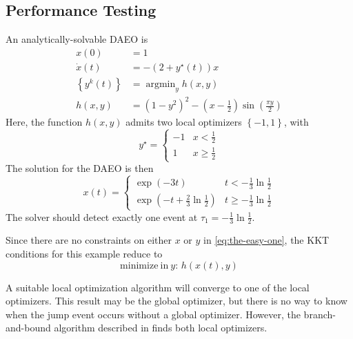 \documentclass[twoside,leqno, twocolumn]{article}
\DeclareMathOperator*{\argmin}{\arg\min}
\begin{document}
\subsection{Performance Testing}
An analytically-solvable DAEO is
\begin{equation}
	\label{eq:the-easy-one}
	\begin{aligned}
		x(0) &= 1\\
		\dot x(t) &= -(2+y^\star(t))x\\
		\left\{y^k(t)\right\} &= \argmin_y h(x,y)\\
		h(x, y) &= (1-y^2)^2 - (x-\frac{1}{2})\sin\left(\frac{\pi y}{2}\right) 
	\end{aligned}
\end{equation}
Here, the function $h(x, y)$ admits two local optimizers $\left\{-1, 1\right\}$, with 
\begin{equation*}
	y^\star = \begin{cases}
		-1 & x<\frac{1}{2}\\
		1 & x \geq \frac{1}{2}
	\end{cases}
\end{equation*}
The solution for the DAEO is then
\begin{equation}
	\label{eq:easy-daeo-solution}
	x(t) = \begin{cases}
		\exp\left(-3t\right) & t < -\frac{1}{3}\ln\frac{1}{2} \\
		\exp\left(-t + \frac{2}{3}\ln\frac{1}{2}\right) & t \geq -\frac{1}{3}\ln\frac{1}{2}
	\end{cases}
\end{equation}
The solver should detect exactly one event at $\tau_1 = -\frac{1}{3}\ln\frac{1}{2}$.

Since there are no constraints on either $x$ or $y$ in \eqref{eq:the-easy-one}, the KKT conditions for this example reduce to
\begin{equation*}
	\mathrm{minimize\ in\ } y:\,h\left(x(t), y\right)
\end{equation*}

A suitable local optimization algorithm will converge to one of the local optimizers. This result may be the global optimizer, but there is no way to know when the jump event occurs without a global optimizer. However, the branch-and-bound algorithm described in  finds both local optimizers.
\end{document}
